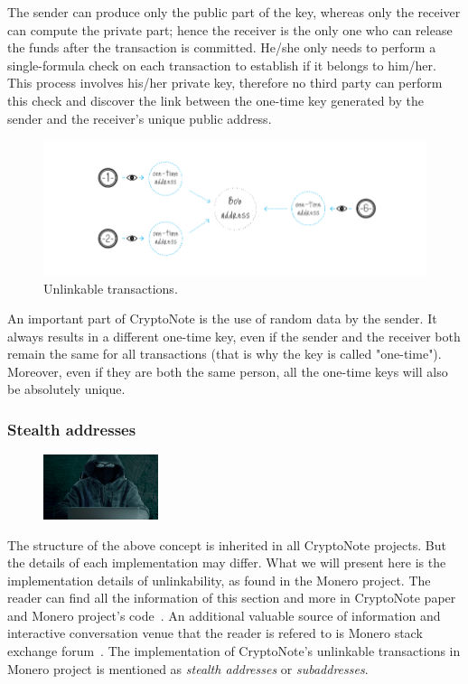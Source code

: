 The sender can produce only the public part of the key, whereas only the receiver can compute the private part; hence the receiver is the only one who can release the funds after the transaction is committed. He/she only needs to perform a single-formula check on each transaction to establish if it belongs to him/her. This process involves his/her private key, therefore no third party can perform this check and discover the link between the one-time key generated by the sender and the receiver's unique public address.
\begin{figure}[ht]
  \centering
  \includegraphics[width=0.9 \columnwidth,keepaspectratio]{Images/CryptoNote/unlinkable.png}
  \caption{Unlinkable transactions.~\cite{cryptonote}}
  \label{fig:unlinkable}
\end{figure}
\vspace{0.15cm}

An important part of CryptoNote is the use of random data by the sender. It always results in a different one-time key, even if the sender and the receiver both remain the same for all transactions (that is why the key is called "one-time"). Moreover, even if they are both the same person, all the one-time keys will also be absolutely unique.

\subsubsection{Stealth addresses} \label{sec:stealth}
\begin{figure}
\centering
\includegraphics[width=0.30\textwidth]{Images/CryptoNote/stealth.jpg}
\end{figure}
The structure of the above concept is inherited in all CryptoNote projects. But the details of each implementation may differ. What we will present here is the implementation details of unlinkability, as found in the Monero project. The reader can find all the information of this section and more in CryptoNote paper~\cite{citeulike:14139412} and Monero project's code~\cite{monerocode}. An additional valuable source of information and interactive conversation venue that the reader is refered to is Monero stack exchange forum~\cite{stackexchange}. The implementation of CryptoNote's unlinkable transactions in Monero project is mentioned as \emph{stealth addresses} or \emph{subaddresses}.

